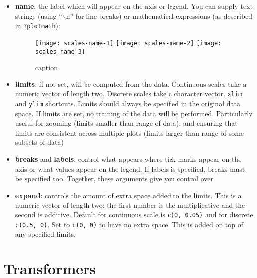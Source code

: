 \begin{itemize}
  \item {\bf name}:  the label which will appear on the axis or legend. You can supply text strings (using ``$\backslash$n'' for line breaks) or mathematical expressions (as described in \verb|?plotmath|):
  
  \begin{figure}[htbp]
    \centering
      \texttt{[image: scales-name-1]}
      \texttt{[image: scales-name-2]}
      \texttt{[image: scales-name-3]}
    \caption{caption}
    \label{fig:label}
  \end{figure}
  

  \item {\bf limits}: if not set, will be computed from the data.  Continuous scales take a numeric vector of length two.  Discrete scales take a character vector.  {\tt xlim} and {\tt ylim} shortcuts.  Limits should always be specified in the original data space.  If limits are set, no training of the data will be performed.  Particularly useful for zooming (limits smaller than range of data), and ensuring that limits are consistent across multiple plots (limits larger than range of some subsets of data)

  \item {\bf breaks} and {\bf labels}: control what appears where tick marks appear on the axis or what values appear on the legend.  If labels is specified, breaks must be specified too.  Together, these arguments give you control over 
  
  \item {\bf expand}: controls the amount of extra space added to the limits.  This is a numeric vector of length two: the first number is the multiplicative and the second is additive.  Default for continuous scale is {\tt c(0, 0.05)} and for discrete {\tt c(0.5, 0)}.  Set to {\tt c(0, 0)} to have no extra space.  This is added on top of any specified limits.
  
\end{itemize}

\section{Transformers}
\label{sec:trans}

